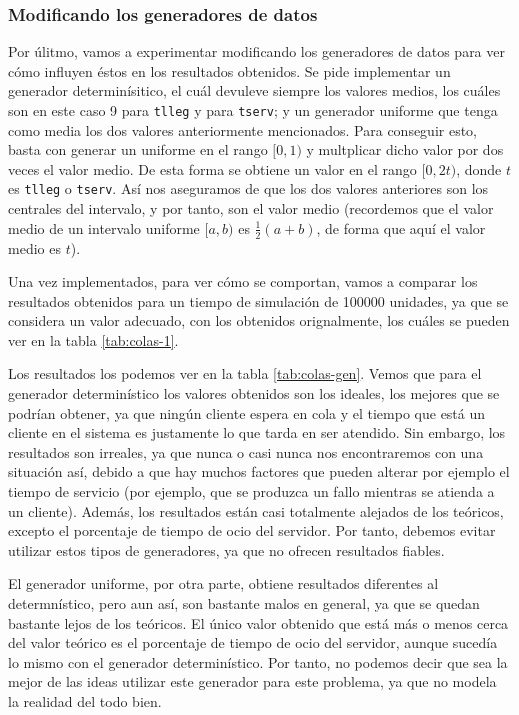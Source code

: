 \documentclass[11pt,a4paper]{article}
\begin{document}
\subsubsection{Modificando los generadores de datos}

Por úlitmo, vamos a experimentar modificando los generadores de datos para ver
cómo influyen éstos en los resultados obtenidos. Se pide implementar un generador
determinísitico, el cuál devuleve siempre los valores medios, los cuáles son en este caso
9 para \texttt{tlleg} y para \texttt{tserv}; y un generador uniforme que tenga
como media los dos valores anteriormente mencionados. Para conseguir esto, basta
con generar un uniforme en el rango $[0, 1)$ y multplicar dicho valor por
dos veces el valor medio. De esta forma se obtiene un valor en el rango
$[0, 2t)$, donde $t$ es \texttt{tlleg} o \texttt{tserv}. Así nos aseguramos
de que los dos valores anteriores son los centrales del intervalo, y por tanto, son
el valor medio (recordemos que el valor medio de un intervalo uniforme $[a, b)$ es
$\frac{1}{2}(a+b)$, de forma que aquí el valor medio es $t$).

Una vez implementados, para ver cómo se comportan, vamos a comparar los resultados
obtenidos para un tiempo de simulación de 100000 unidades, ya que se considera
un valor adecuado, con los obtenidos orignalmente, los cuáles se pueden ver en
la tabla \ref{tab:colas-1}.

Los resultados los podemos ver en la tabla \ref{tab:colas-gen}. Vemos que para
el generador determinístico los valores obtenidos son los ideales, los mejores que
se podrían obtener, ya que ningún cliente espera en cola y el tiempo que está un
cliente en el sistema es justamente lo que tarda en ser atendido. Sin embargo,
los resultados son irreales, ya que nunca o casi nunca nos encontraremos con
una situación así, debido a que hay muchos factores que pueden alterar por ejemplo
el tiempo de servicio (por ejemplo, que se produzca un fallo mientras se atienda
a un cliente). Además, los resultados están casi totalmente alejados de los teóricos,
excepto el porcentaje de tiempo de ocio del servidor. Por tanto, debemos evitar utilizar
estos tipos de generadores, ya que no ofrecen resultados fiables.

El generador uniforme, por otra parte, obtiene resultados diferentes al determnístico,
pero aun así, son bastante malos en general, ya que se quedan bastante lejos de
los teóricos. El único valor obtenido que está más o menos cerca del valor teórico
es el porcentaje de tiempo de ocio del servidor, aunque sucedía lo mismo con el
generador determinístico. Por tanto, no podemos decir que sea la mejor de las ideas
utilizar este generador para este problema, ya que no modela la realidad del todo bien.
\end{document}
